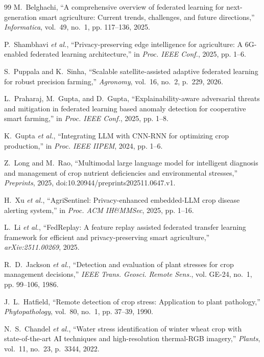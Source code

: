 \documentclass[10pt,journal,compsoc]{IEEEtran}
\begin{document}
\begin{thebibliography}{99}
M.~Belghachi, ``A comprehensive overview of federated learning for next-generation smart agriculture: Current trends, challenges, and future directions,'' \textit{Informatica}, vol.~49, no.~1, pp. 117--136, 2025.

P.~Shambhavi \textit{et al.}, ``Privacy-preserving edge intelligence for agriculture: A 6G-enabled federated learning architecture,'' in \textit{Proc. IEEE Conf.}, 2025, pp. 1--6.

S.~Puppala and K.~Sinha, ``Scalable satellite-assisted adaptive federated learning for robust precision farming,'' \textit{Agronomy}, vol.~16, no.~2, p.~229, 2026.

L.~Praharaj, M.~Gupta, and D.~Gupta, ``Explainability-aware adversarial threats and mitigation in federated learning based anomaly detection for cooperative smart farming,'' in \textit{Proc. IEEE Conf.}, 2025, pp. 1--8.

K.~Gupta \textit{et al.}, ``Integrating LLM with CNN-RNN for optimizing crop production,'' in \textit{Proc. IEEE IIPEM}, 2024, pp. 1--6.

Z.~Long and M.~Rao, ``Multimodal large language model for intelligent diagnosis and management of crop nutrient deficiencies and environmental stresses,'' \textit{Preprints}, 2025, doi:10.20944/preprints202511.0647.v1.

H.~Xu \textit{et al.}, ``AgriSentinel: Privacy-enhanced embedded-LLM crop disease alerting system,'' in \textit{Proc. ACM IH\&MMSec}, 2025, pp. 1--16.

L.~Li \textit{et al.}, ``FedReplay: A feature replay assisted federated transfer learning framework for efficient and privacy-preserving smart agriculture,'' \textit{arXiv:2511.00269}, 2025.

R.~D.~Jackson \textit{et al.}, ``Detection and evaluation of plant stresses for crop management decisions,'' \textit{IEEE Trans. Geosci. Remote Sens.}, vol. GE-24, no.~1, pp. 99--106, 1986.

J.~L.~Hatfield, ``Remote detection of crop stress: Application to plant pathology,'' \textit{Phytopathology}, vol.~80, no.~1, pp. 37--39, 1990.

N.~S.~Chandel \textit{et al.}, ``Water stress identification of winter wheat crop with state-of-the-art AI techniques and high-resolution thermal-RGB imagery,'' \textit{Plants}, vol.~11, no.~23, p.~3344, 2022.


\end{thebibliography}
\end{document}
